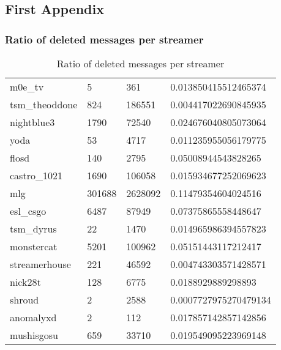 \documentclass[final]{report} %
\begin{document}
\begin{appendices}
\renewcommand{\chapternumber}{\appendixname\space\thechapter}

\chapter{First Appendix}\label{app:first-appendix}

\subsection{Ratio of deleted messages per streamer}
\begin{table}[]
\centering
\caption{Ratio of deleted messages per streamer}
\label{my-label}
\begin{tabular}{llll}
m0e\_tv          & 5      & 361     & 0.013850415512465374  \\
tsm\_theoddone   & 824    & 186551  & 0.004417022690845935  \\
nightblue3       & 1790   & 72540   & 0.024676040805073064  \\
yoda             & 53     & 4717    & 0.011235955056179775  \\
flosd            & 140    & 2795    & 0.05008944543828265   \\
castro\_1021     & 1690   & 106058  & 0.015934677252069623  \\
mlg              & 301688 & 2628092 & 0.11479354604024516   \\
esl\_csgo        & 6487   & 87949   & 0.07375865558448647   \\
tsm\_dyrus       & 22     & 1470    & 0.014965986394557823  \\
monstercat       & 5201   & 100962  & 0.05151443117212417   \\
streamerhouse    & 221    & 46592   & 0.004743303571428571  \\
nick28t          & 128    & 6775    & 0.0188929889298893    \\
shroud           & 2      & 2588    & 0.0007727975270479134 \\
anomalyxd        & 2      & 112     & 0.017857142857142856  \\
mushisgosu       & 659    & 33710   & 0.019549095223969148  \\

\end{tabular}
\end{table}
\end{appendices}
\end{document}
